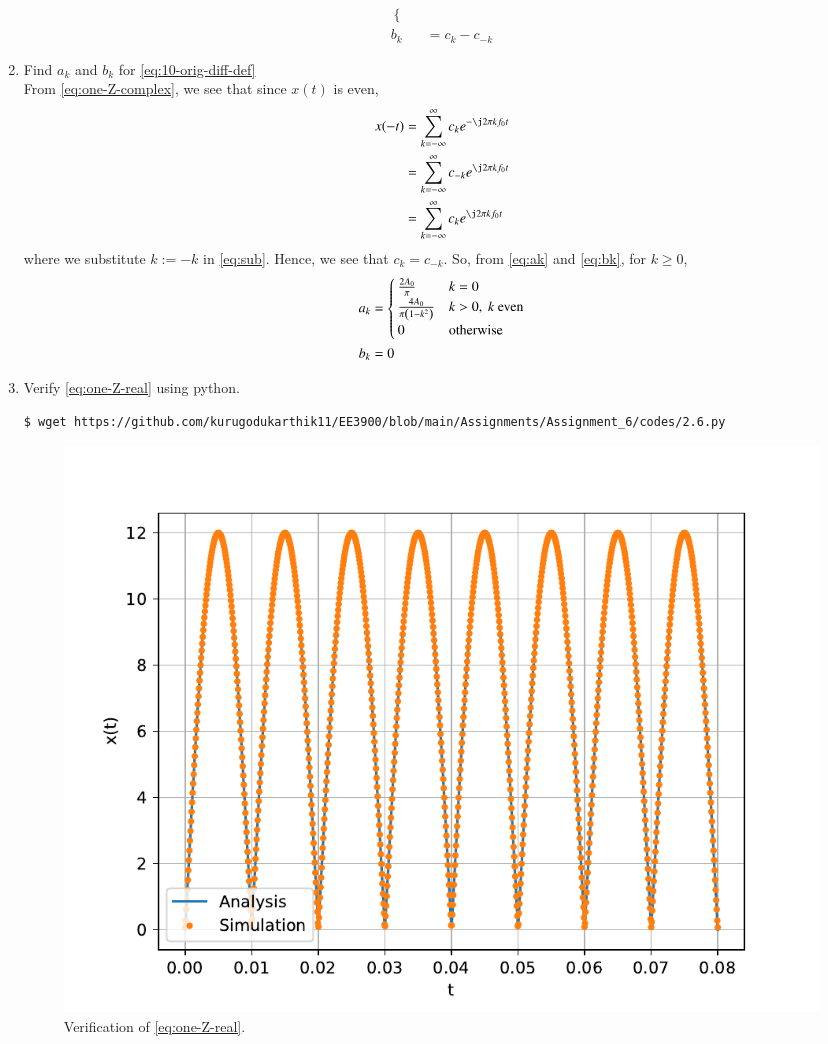 \documentclass[journal,12pt,twocolumn]{IEEEtran}
\renewcommand\thesection{\arabic{section}}
\begin{document}
\begin{enumerate}[label=\thesection.\arabic*,ref=\thesection.\theenumi]
\begin{align}
\begin{cases}
\end{cases} \label{eq:ak} \\
b_k &= c_k - c_{-k}
\label{eq:bk}
\end{align}
\item Find $a_k$ and $b_k$ for
\eqref{eq:10-orig-diff-def} \\
\solution From \eqref{eq:one-Z-complex}, we see that since $x(t)$ is even,
\begin{align}
x(-t) &= \sum_{k = -\infty}^{\infty}c_ke^{-\j2\pi kf_0 t} \\
&= \sum_{k = -\infty}^{\infty}c_{-k}e^{\j2\pi kf_0t} \label{eq:sub} \\
&= \sum_{k = -\infty}^{\infty}c_ke^{\j2\pi kf_0 t}
\end{align}
where we substitute $k := -k$ in \eqref{eq:sub}. Hence, we see that
$c_k = c_{-k}$. So, from \eqref{eq:ak} and \eqref{eq:bk}, for $k \ge 0$,
\begin{align}
a_k &=
\begin{cases}
\frac{2A_0}{\pi} & k = 0 \\
\frac{4A_0}{\pi\left(1 - k^2\right)} & k > 0,\ k\ \text{even} \\
0 & \text{otherwise}
\end{cases} \label{eq:ak-xt}\\
b_k &= 0
\label{eq:bk-xt}
\end{align}
\item Verify
\eqref{eq:one-Z-real}
using python. \\
\solution
\begin{lstlisting}
$ wget https://github.com/kurugodukarthik11/EE3900/blob/main/Assignments/Assignment_6/codes/2.6.py
\end{lstlisting}
\begin{figure}[!ht]
\includegraphics[width=\columnwidth]{figs/2.6.pdf}
\caption{Verification of \eqref{eq:one-Z-real}.}
\label{fig:ver-real}
\end{figure}
\end{enumerate}
\end{document}
